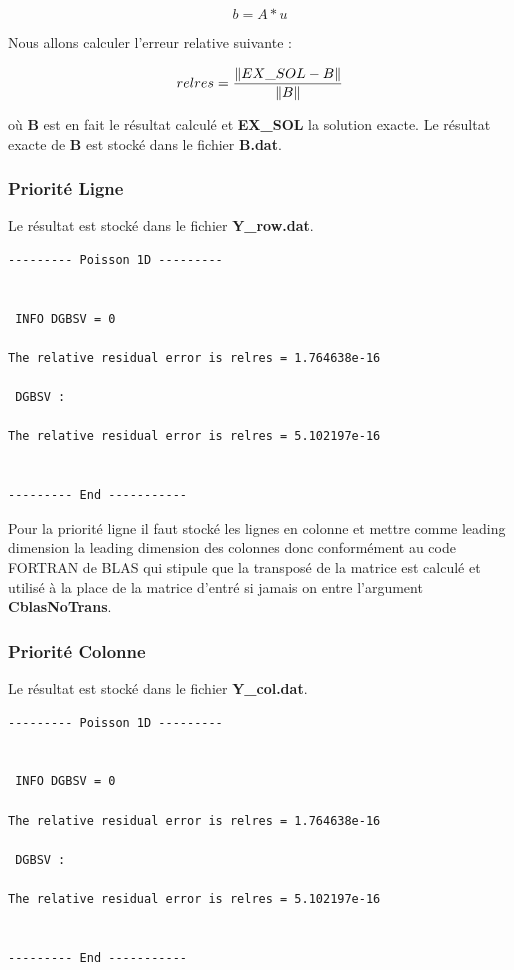 \documentclass[11pt]{article}
\DeclarePairedDelimiter{\norm}{\lVert}{\rVert}
\begin{document}
\begin{equation*}
b = A * u
\end{equation*}

Nous allons calculer l'erreur relative suivante :

\begin{equation*}
relres = \frac{\norm{EX\_SOL - B}}{\norm{B}}
\end{equation*}

où \textbf{B} est en fait le résultat calculé et \textbf{EX\_SOL} la
solution exacte.\newline
Le résultat exacte de \textbf{B} est stocké dans le fichier \textbf{B.dat}.

\subsubsection{Priorité Ligne}

Le résultat est stocké dans le fichier \textbf{Y\_row.dat}.\newline

\begin{lstlisting}
--------- Poisson 1D ---------


 INFO DGBSV = 0

The relative residual error is relres = 1.764638e-16

 DGBSV :

The relative residual error is relres = 5.102197e-16


--------- End -----------
\end{lstlisting}

Pour la priorité ligne il faut stocké les lignes en colonne et mettre
comme leading dimension la leading dimension des colonnes donc
conformément au code FORTRAN de BLAS qui stipule que la transposé de
la matrice est calculé et utilisé à la place de la matrice d'entré si
jamais on entre l'argument \textbf{CblasNoTrans}.

\subsubsection{Priorité Colonne}

Le résultat est stocké dans le fichier \textbf{Y\_col.dat}.

\begin{lstlisting}
--------- Poisson 1D ---------


 INFO DGBSV = 0

The relative residual error is relres = 1.764638e-16

 DGBSV :

The relative residual error is relres = 5.102197e-16


--------- End -----------
\end{lstlisting}
\end{document}
